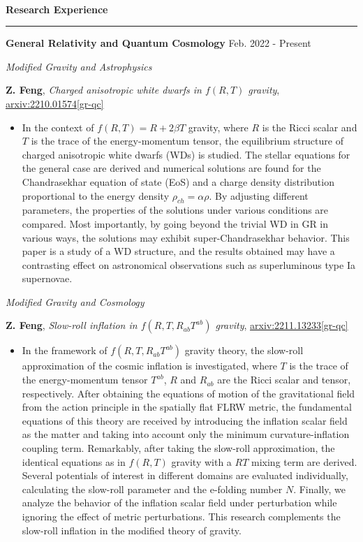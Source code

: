 \documentclass[12pt]{article}
\newcommand{\sect}[1]{
    ~\\ \noindent \textbf{#1} \medskip \hrule \medskip
}
\begin{document}

\sect{Research Experience}

\textbf{General Relativity and Quantum Cosmology} \hfill Feb. 2022 - Present

\smallskip \quad \textit{Modified Gravity and Astrophysics}

\textbf{Z. Feng}, \textit{Charged anisotropic white dwarfs in $f\left({R}, {T}\right)$ gravity}, \href{https://arxiv.org/abs/2210.01574}{arxiv:2210.01574[gr-qc]}

\begin{itemize}[noitemsep,nolistsep]
    \item In the context of $f(R, T) = R + 2 \beta T$ gravity, where $R$ is the Ricci scalar and $T$ is the trace of the energy-momentum tensor, the equilibrium structure of charged anisotropic white dwarfs (WDs) is studied. The stellar equations for the general case are derived and numerical solutions are found for the Chandrasekhar equation of state (EoS) and a charge density distribution proportional to the energy density $\rho_{ch} = \alpha \rho$. By adjusting different parameters, the properties of the solutions under various conditions are compared. Most importantly, by going beyond the trivial WD in GR in various ways, the solutions may exhibit super-Chandrasekhar behavior. This paper is a study of a WD structure, and the results obtained may have a contrasting effect on astronomical observations such as superluminous type Ia supernovae.
\end{itemize}

\smallskip \quad \textit{Modified Gravity and Cosmology}

\textbf{Z. Feng}, \textit{Slow-roll inflation in $f\left(R, T, R_{ab}T^{ab}\right)$ gravity}, \href{https://arxiv.org/abs/2211.13233}{arxiv:2211.13233[gr-qc]}

\begin{itemize}[noitemsep,nolistsep]
    \item In the framework of $f\left(R, T, R_{ab}T^{ab}\right)$ gravity theory, the slow-roll approximation of the cosmic inflation is investigated, where $T$ is the trace of the energy-momentum tensor $T^{ab}$, $R$ and $R_{ab}$ are the Ricci scalar and tensor, respectively. After obtaining the equations of motion of the gravitational field from the action principle in the spatially flat FLRW metric, the fundamental equations of this theory are received by introducing the inflation scalar field as the matter and taking into account only the minimum curvature-inflation coupling term. Remarkably, after taking the slow-roll approximation, the identical equations as in $f(R, T)$ gravity with a $RT$ mixing term are derived. Several potentials of interest in different domains are evaluated individually, calculating the slow-roll parameter and the e-folding number $N$. Finally, we analyze the behavior of the inflation scalar field under perturbation while ignoring the effect of metric perturbations. This research complements the slow-roll inflation in the modified theory of gravity.
\end{itemize}
\end{document}
